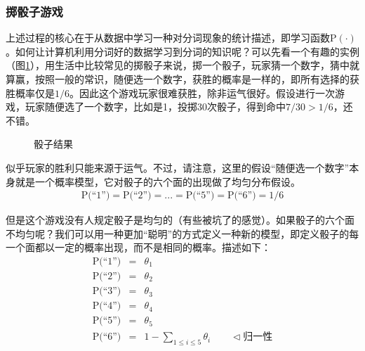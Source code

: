 
\subsubsection{掷骰子游戏}

\parinterval 上述过程的核心在于从数据中学习一种对分词现象的统计描述，即学习函数$\textrm{P}(\cdot)$。如何让计算机利用分词好的数据学习到分词的知识呢？可以先看一个有趣的实例（图\ref{fig:2-11}），用生活中比较常见的掷骰子来说，掷一个骰子，玩家猜一个数字，猜中就算赢，按照一般的常识，随便选一个数字，获胜的概率是一样的，即所有选择的获胜概率仅是$1/6$。因此这个游戏玩家很难获胜，除非运气很好。假设进行一次游戏，玩家随便选了一个数字，比如是1，投掷30次骰子，得到命中$7/30 > 1/6$，还不错。
\vspace{-0.5em}

\begin{figure}[htp]
\centering

\caption{骰子结果}
\label{fig:2-11}
\end{figure}

\vspace{-0.5em}
\parinterval 似乎玩家的胜利只能来源于运气。不过，请注意，这里的假设``随便选一个数字''本身就是一个概率模型，它对骰子的六个面的出现做了均匀分布假设。
\begin{eqnarray}
\textrm{P(``1'')}=\textrm{P(``2'')}=...=\textrm{P(``5'')}=\textrm{P(``6'')}=1/6
\label{eq:2-17}
\end{eqnarray}

\vspace{-0.5em}
\parinterval 但是这个游戏没有人规定骰子是均匀的（有些被坑了的感觉）。如果骰子的六个面不均匀呢？我们可以用一种更加``聪明''的方式定义一种新的模型，即定义骰子的每一个面都以一定的概率出现，而不是相同的概率。描述如下：
\begin{eqnarray}
\textrm{P(``1'')} &=&\theta_1 \nonumber \\
\textrm{P(``2'')} &=&\theta_2 \nonumber \\
\textrm{P(``3'')} &=&\theta_3 \nonumber \\
\textrm{P(``4'')} &=&\theta_4 \nonumber \\
\textrm{P(``5'')} &=&\theta_5 \nonumber \\
\textrm{P(``6'')} &=&1-\sum_{1 \leq i \leq 5}\theta_i \qquad \lhd \textrm {归一性}
\label{eq:2-18}
\end{eqnarray}

